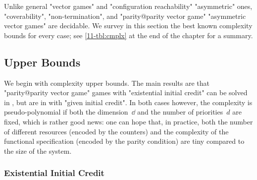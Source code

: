 Unlike general "vector games" and "configuration reachability"
"asymmetric" ones, "coverability", "non-termination", and
"parity@parity vector game" "asymmetric vector games" are decidable.
We survey in this section the best known complexity bounds for every
case; see \cref{11-tbl:cmplx} at the end of the chapter for a summary.

\subsection{Upper Bounds}
\label{11-sec:up}
We begin with complexity upper bounds.  The main results are that
"parity@parity vector game" games with "existential initial credit"
can be solved in \coNP, but are in \kEXP[2] with "given initial
credit".  In both cases however, the complexity is pseudo-polynomial
if both the dimension~$\dd$ and the number of priorities~$d$ are
fixed, which is rather good news: one can hope that, in practice, both
the number of different resources (encoded by the counters) and the
complexity of the functional specification (encoded by the parity
condition) are tiny compared to the size of the system.

%
\subsubsection{Existential Initial Credit}
\label{11-sec:up-exist}

